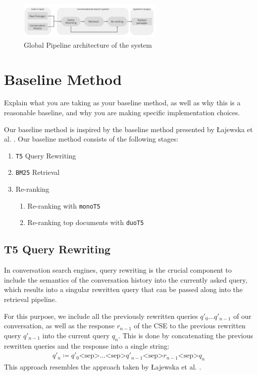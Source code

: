 \documentclass[sigconf]{acmart}
\begin{document}
\begin{figure}[h]
	\includegraphics[width=7cm]{pipeline.png}
	\caption{Global Pipeline architecture of the system}
	\label{figure:global_pipeline}
\end{figure}


\section{Baseline Method}\label{sec:baseline}
Explain what you are taking as your baseline method, as well as why this is a reasonable baseline, and why you are making specific implementation choices.

Our baseline method is inspired by the baseline method presented by Łajewska et al. \cite{Lajewska:2023:ECIR}. Our baseline method consists of the following stages:
\begin{enumerate}
	\item	\texttt{T5} Query Rewriting
	\item	\texttt{BM25} Retrieval
	\item	Re-ranking
			\begin{enumerate}
				\item	Re-ranking with \texttt{monoT5}
				\item	Re-ranking top documents with \texttt{duoT5}
			\end{enumerate}
\end{enumerate}

\subsection{T5 Query Rewriting}
In conversation search engines, query rewriting is the crucial component to include the semantics of the conversation history into the currently asked query, which results into a singular rewritten query that can be passed along into the retrieval pipeline.

For this purpose, we include all the previously rewritten queries $q'_0 \dots q'_{n-1}$ of our conversation, as well as the response $r_{n-1}$ of the CSE to the previous rewritten query $q'_{n-1}$ into the current query $q_n$. This is done by concatenating the previous rewritten queries and the response into a single string:
\begin{align*}
	q'_n \coloneqq q'_0 \text{<sep>} \dots \text{<sep>} q'_{n-1} \text{<sep>} r_{n-1} \text{<sep>} q_n
\end{align*}
This approach resembles the approach taken by Łajewska et al. \cite{Lajewska:2023:ECIR}.
\end{document}
